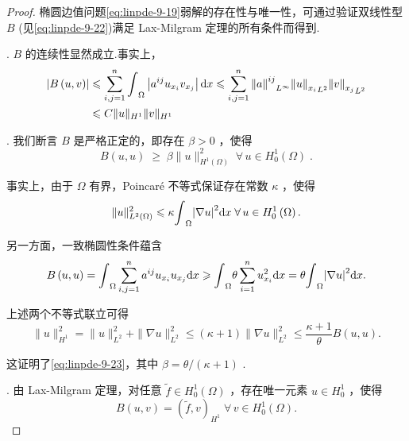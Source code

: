 \begin{proof}
椭圆边值问题\eqref{eq:linpde-9-19}弱解的存在性与唯一性，可通过验证双线性型 $B$ (见\eqref{eq:linpde-9-22})满足 Lax-Milgram 定理的所有条件而得到.

. $B$ 的连续性显然成立.事实上，
{\setjot[-2]\begin{align*}
    \left| {B\left(  {u,v}\right)  }\right|  &\leqslant  \sum_{{i,j = 1}}^{n}{\int }_{\Omega }\left| {{a}^{ij}{u}_{{x}_{i}}{v}_{{x}_{j}}}\right| {\mathop{}\!\mathrm{d} x} \leqslant  \sum_{{i,j = 1}}^{n}{\norm{a}^{ij}}_{{L}^{\infty }}{\norm{u}_{{x}_{i}}}_{{L}^{2}}{\norm{v}_{{x}_{j}}}_{{L}^{2}}\\
    &\leqslant  C\| u{\| }_{{H}^{1}}\| v{\| }_{{H}^{1}}
\end{align*}}

. 我们断言 $B$ 是严格正定的，即存在 $\beta  > 0$ ，使得
\begin{equation}\tag{9.23}\label{eq:linpde-9-23}
B\left(  {u,u}\right)  \; \geq  \;\beta \| u{\| }_{{H}^{1}\left( \Omega \right) }^{2}\;\forall\,u \in  {H}_{0}^{1}\left( \Omega \right) \;.
\end{equation}

事实上，由于 $\Omega$ 有界，Poincaré 不等式保证存在常数 $\kappa$ ，使得
\[
\| u{\| }_{{L}^{2}\left( \Omega \right) }^{2} \leqslant  \kappa {\int }_{\Omega }{\left| \nabla u\right| }^{2}{\mathop{}\!\mathrm{d} x}\;\forall\,u \in  {H}_{0}^{1}\left( \Omega \right) .
\]

另一方面，一致椭圆性条件蕴含
\[
B\left(  {u,u}\right)   = {\int }_{\Omega }\sum_{{i,j = 1}}^{n}{a}^{ij}{u}_{{x}_{i}}{u}_{{x}_{j}}{\mathop{}\!\mathrm{d} x} \geqslant  {\int }_{\Omega }\theta \sum_{{i = 1}}^{n}{u}_{{x}_{i}}^{2}{\mathop{}\!\mathrm{d} x} = \theta {\int }_{\Omega }{\left| \nabla u\right| }^{2}{\mathop{}\!\mathrm{d} x}.
\]

上述两个不等式联立可得
\[
\| u{\| }_{{H}^{1}}^{2} = \| u{\| }_{{L}^{2}}^{2} + \| \nabla u{\| }_{{L}^{2}}^{2} \leq  \left( {\kappa  + 1}\right) \| \nabla u{\| }_{{L}^{2}}^{2} \leq  \frac{\kappa  + 1}{\theta }B\left(  {u,u}\right)  .
\]

这证明了\eqref{eq:linpde-9-23}，其中 $\beta  = \theta /\left( {\kappa  + 1}\right)$ .

. 由 Lax-Milgram 定理，对任意 $\widetilde{f} \in  {H}_{0}^{1}\left( \Omega \right)$ ，存在唯一元素 $u \in  {H}_{0}^{1}$ ，使得
\begin{equation}\tag{9.24}\label{eq:linpde-9-24}
B\left(  {u,v}\right)   = {\left( \widetilde{f},v\right) }_{{H}^{1}}\;\forall\,v \in  {H}_{0}^{1}\left( \Omega \right) .
\end{equation}


\end{proof}
